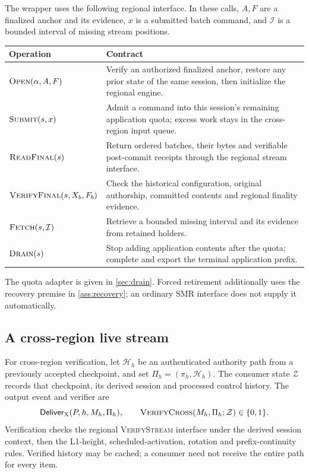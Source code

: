 \documentclass[11pt,a4paper,onecolumn]{article}
\newcommand{\Tag}[1]{\ensuremath{\mathsf{#1}}}
\newcommand{\Proc}[1]{\textnormal{\textsc{#1}}}
\begin{document}
The wrapper uses the following regional interface. In these calls,
$A,F$ are a finalized anchor and its evidence, $x$ is a submitted batch
command, and $\mathcal I$ is a bounded interval of missing stream positions.
\begin{center}\small
\begin{tabularx}{\linewidth}{@{}p{.29\linewidth}Y@{}}\toprule
Operation & Contract\\\midrule
$\Proc{Open}(\alpha,A,F)$ & Verify an authorized finalized anchor, restore
any prior state of the same session, then initialize the regional engine.\\
$\Proc{Submit}(s,x)$ & Admit a command into this session's remaining
application quota; excess work stays in the cross-region input queue.\\
$\Proc{ReadFinal}(s)$ & Return ordered batches, their bytes and verifiable
post-commit receipts through the regional stream interface.\\
$\Proc{VerifyFinal}(s,X_b,F_b)$ & Check the historical configuration,
original authorship, committed contents and regional finality evidence.\\
$\Proc{Fetch}(s,\mathcal I)$ & Retrieve a bounded missing interval and
its evidence from retained holders.\\
$\Proc{Drain}(s)$ & Stop adding application contents after the quota;
complete and export the terminal application prefix.\\\bottomrule
\end{tabularx}
\end{center}
The quota adapter is given in \cref{sec:drain}. Forced retirement additionally
uses the recovery premise in \cref{ass:recovery}; an ordinary SMR interface
does not supply it automatically.

\subsection{A cross-region live stream}\label{sec:xstream}
For cross-region verification, let $\mathcal H_h$ be an authenticated
authority path from a previously accepted checkpoint, and set
$\Pi_h=(\pi_h,\mathcal H_h)$. The consumer state $\mathcal Z$ records that
checkpoint, its derived session and processed control history. The output
event and verifier are
\[
 \Tag{Deliver}_{\rm X}(P,h,M_h,\Pi_h),\qquad
 \Proc{VerifyCross}(M_h,\Pi_h;\mathcal Z)\in\{0,1\}.
\]
Verification checks the
regional \Proc{VerifyStream} interface under the derived session context,
then the L1-height, scheduled-activation, rotation and prefix-continuity
rules. Verified history
may be cached; a consumer need not receive the entire path for every item.
\end{document}
